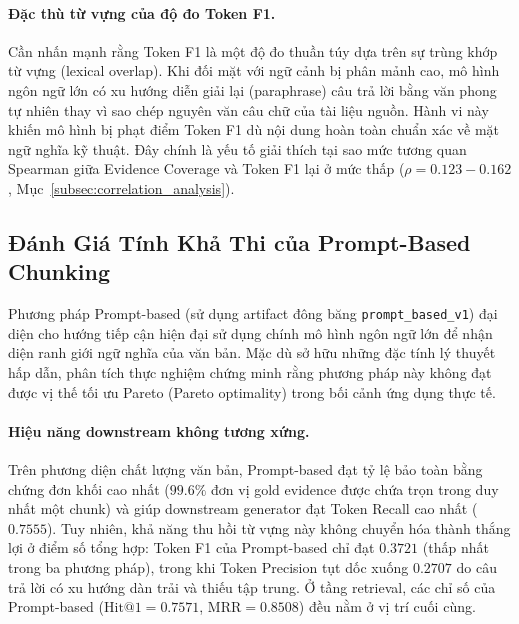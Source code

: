 \paragraph{Đặc thù từ vựng của độ đo Token F1.}
Cần nhấn mạnh rằng Token F1 là một độ đo thuần túy dựa trên sự trùng khớp từ vựng (lexical overlap). Khi đối mặt với ngữ cảnh bị phân mảnh cao, mô hình ngôn ngữ lớn có xu hướng diễn giải lại (paraphrase) câu trả lời bằng văn phong tự nhiên thay vì sao chép nguyên văn câu chữ của tài liệu nguồn. Hành vi này khiến mô hình bị phạt điểm Token F1 dù nội dung hoàn toàn chuẩn xác về mặt ngữ nghĩa kỹ thuật. Đây chính là yếu tố giải thích tại sao mức tương quan Spearman giữa Evidence Coverage và Token F1 lại ở mức thấp ($\rho = 0.123 - 0.162$, Mục~\ref{subsec:correlation_analysis}).

\subsection{Đánh Giá Tính Khả Thi của Prompt-Based Chunking}
\label{subsec:prompt_based_viability}

Phương pháp Prompt-based (sử dụng artifact đông băng \texttt{prompt\_based\_v1}) đại diện cho hướng tiếp cận hiện đại sử dụng chính mô hình ngôn ngữ lớn để nhận diện ranh giới ngữ nghĩa của văn bản. Mặc dù sở hữu những đặc tính lý thuyết hấp dẫn, phân tích thực nghiệm chứng minh rằng phương pháp này không đạt được vị thế tối ưu Pareto (Pareto optimality) trong bối cảnh ứng dụng thực tế.

\paragraph{Hiệu năng downstream không tương xứng.}
Trên phương diện chất lượng văn bản, Prompt-based đạt tỷ lệ bảo toàn bằng chứng đơn khối cao nhất ($99.6\%$ đơn vị gold evidence được chứa trọn trong duy nhất một chunk) và giúp downstream generator đạt Token Recall cao nhất ($0.7555$). Tuy nhiên, khả năng thu hồi từ vựng này không chuyển hóa thành thắng lợi ở điểm số tổng hợp: Token F1 của Prompt-based chỉ đạt $0.3721$ (thấp nhất trong ba phương pháp), trong khi Token Precision tụt dốc xuống $0.2707$ do câu trả lời có xu hướng dàn trải và thiếu tập trung. Ở tầng retrieval, các chỉ số của Prompt-based ($\text{Hit@1} = 0.7571$, $\text{MRR} = 0.8508$) đều nằm ở vị trí cuối cùng.

